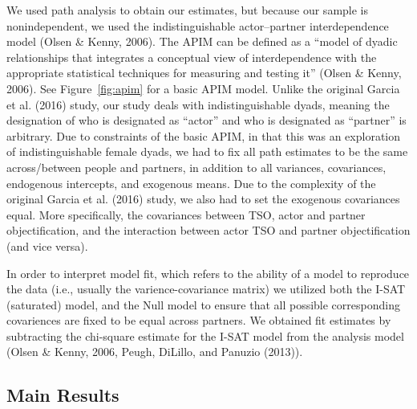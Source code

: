 \documentclass[man]{apa6}
\begin{document}
We used path analysis to obtain our estimates, but because our sample is
nonindependent, we used the indistinguishable actor--partner
interdependence model (Olsen \& Kenny, 2006). The APIM can be defined as
a \enquote{model of dyadic relationships that integrates a conceptual
view of interdependence with the appropriate statistical techniques for
measuring and testing it} (Olsen \& Kenny, 2006). See
Figure~\ref{fig:apim} for a basic APIM model. Unlike the original Garcia
et al. (2016) study, our study deals with indistinguishable dyads,
meaning the designation of who is designated as \enquote{actor} and who
is designated as \enquote{partner} is arbitrary. Due to constraints of
the basic APIM, in that this was an exploration of indistinguishable
female dyads, we had to fix all path estimates to be the same
across/between people and partners, in addition to all variances,
covariances, endogenous intercepts, and exogenous means. Due to the
complexity of the original Garcia et al. (2016) study, we also had to
set the exogenous covariances equal. More specifically, the covariances
between TSO, actor and partner objectification, and the interaction
between actor TSO and partner objectification (and vice versa).

In order to interpret model fit, which refers to the ability of a model
to reproduce the data (i.e., usually the varience-covariance matrix) we
utilized both the I-SAT (saturated) model, and the Null model to ensure
that all possible corresponding covariences are fixed to be equal across
partners. We obtained fit estimates by subtracting the chi-square
estimate for the I-SAT model from the analysis model (Olsen \& Kenny,
2006, Peugh, DiLillo, and Panuzio (2013)).

\subsection{Main Results}\label{main-results}
\end{document}

